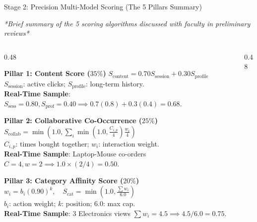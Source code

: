 \documentclass[10pt]{beamer}
\begin{document}
\begin{frame}{Stage 2: Precision Multi-Model Scoring (The 5 Pillars Summary)}
\begin{center}\scriptsize
\textit{*Brief summary of the 5 scoring algorithms discussed with faculty in preliminary reviews*}
\end{center}
\vspace*{-0.2cm}
\begin{columns}[T]
    \begin{column}{0.48\textwidth}
        \begin{block}{\color{brandred}\textbf{Pillar 1: Content Score ($35\%$)}}
            \scriptsize
            $S_{\text{content}} = 0.70 S_{\text{session}} + 0.30 S_{\text{profile}}$\\
            $S_{\text{session}}$: active clicks; $S_{\text{profile}}$: long-term history.\\
            \textbf{Real-Time Sample}: $S_{\text{sess}}=0.80, S_{\text{prof}}=0.40 \implies 0.7(0.8) + 0.3(0.4) = \mathbf{0.68}$.
        \end{block}
        \begin{block}{\color{brandorange}\textbf{Pillar 2: Collaborative Co-Occurrence ($25\%$)}}
            \scriptsize
            $S_{\text{collab}} = \min(1.0, \sum_i \min(1.0, \frac{C_{i,p}}{4}) \frac{w_i}{4})$\\
            $C_{i,p}$: times bought together; $w_i$: interaction weight.\\
            \textbf{Real-Time Sample}: Laptop-Mouse co-orders $C=4, w=2 \implies 1.0 \times (2/4) = \mathbf{0.50}$.
        \end{block}
        \begin{block}{\color{brandred}\textbf{Pillar 3: Category Affinity Score ($20\%$)}}
            \scriptsize
            $w_i = b_i (0.90)^k, \quad S_{\text{cat}} = \min(1.0, \frac{\sum w_i}{6.0})$\\
            $b_i$: action weight; $k$: position; $6.0$: max cap.\\
            \textbf{Real-Time Sample}: 3 Electronics views $\sum w_i = 4.5 \implies 4.5 / 6.0 = \mathbf{0.75}$.
        \end{block}
    \end{column}%
    \begin{column}{0.48\textwidth}

\end{column}
\end{columns}
\end{frame}
\end{document}
